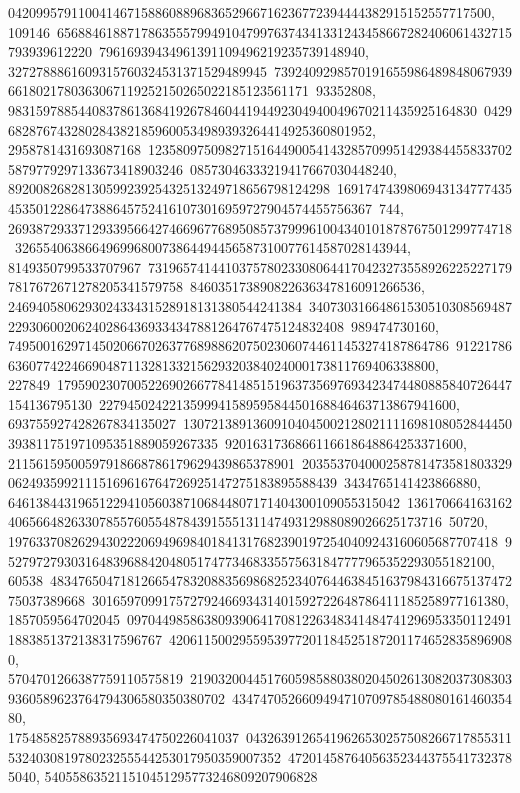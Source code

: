 {{{042099579110041467158860889683652966716236772394444382915152557717500, 109146\
65688461887178635557994910479976374341331243458667282406061432715793939612220\
79616939434961391109496219235739148940, 3272788861609315760324531371529489945\
73924092985701916559864898480679396618021780363067119252150265022185123561171\
93352808, 9831597885440837861368419267846044194492304940049670211435925164830\
04296828767432802843821859600534989393264414925360801952, 2958781431693087168\
12358097509827151644900541432857099514293844558337025879779297133673418903246\
08573046333219417667030448240, 8920082682813059923925432513249718656798124298\
16917474398069431347774354535012286473886457524161073016959727904574455756367\
744, 269387293371293395664274669677689508573799961004340101878767501299774718\
32655406386649699680073864494456587310077614587028143944, 8149350799533707967\
73196574144103757802330806441704232735589262252271797817672671278205341579758\
846035173890822636347816091266536, 246940580629302433431528918131380544241384\
34073031664861530510308569487229306002062402864369334347881264767475124832408\
989474730160, 749500162971450206670263776898862075023060744611453274187864786\
912217866360774224669048711328133215629320384024000173811769406338800, 227849\
17959023070052269026677841485151963735697693423474480885840726447154136795130\
227945024221359994158959584450168846463713867941600, 693755927428267834135027\
13072138913609104045002128021111698108052844450393811751971095351889059267335\
9201631736866116618648864253371600, 21156159500597918668786179629439865378901\
20355370400025878147358180332906249359921115169616764726925147275183895588439\
3434765141423866880, 64613844319651229410560387106844807171404300109055315042\
13617066416316240656648263307855760554878439155513114749312988089026625173716\
50720, 1976337082629430222069496984018413176823901972540409243160605687707418\
9527972793031648396884204805174773468335575631847777965352293055182100, 60538\
48347650471812665478320883569868252340764463845163798431667513747275037389668\
30165970991757279246693431401592722648786411185258977161380, 1857059564702045\
09704498586380939064170812263483414847412969533501124911883851372138317596767\
42061150029559539772011845251872011746528358969080, 5704701266387759110575819\
21903200445176059858803802045026130820373083039360589623764794306580350380702\
434747052660949471070978548808016146035480, 175485825788935693474750226041037\
04326391265419626530257508266717855311532403081978023255544253017950359007352\
472014587640563523443755417323785040, 540558635211510451295773246809207906828\
}}}
